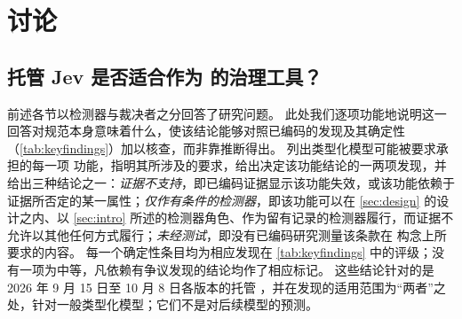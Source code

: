 \section{讨论}
\label{sec:discussion}

\subsection{托管 Jev 是否适合作为 \pol{} 的治理工具？}
\label{sec:verdict}

前述各节以检测器与裁决者之分回答了研究问题。
此处我们逐项功能地说明这一回答对规范本身意味着什么，使该结论能够对照已编码的发现及其确定性（\cref{tab:keyfindings}）加以核查，而非靠推断得出。
 列出类型化模型可能被要求承担的每一项 \pol{} 功能，指明其所涉及的要求，给出决定该功能结论的一两项发现，并给出三种结论之一：\emph{证据不支持}，即已编码证据显示该功能失效，或该功能依赖于证据所否定的某一属性；\emph{仅作有条件的检测器}，即该功能可以在 \cref{sec:design} 的设计之内、以 \cref{sec:intro} 所述的检测器角色、作为留有记录的检测器履行，而证据不允许以其他任何方式履行；\emph{未经测试}，即没有已编码研究测量该条款在 \pol{} 构念上所要求的内容。
每一个确定性条目均为相应发现在 \cref{tab:keyfindings} 中的评级；没有一项为中等，凡依赖有争议发现的结论均作了相应标记。
这些结论针对的是 2026 年 9 月 15 日至 10 月 8 日各版本的托管 \jev{}，并在发现的适用范围为“两者”之处，针对一般类型化模型；它们不是对后续模型的预测。

